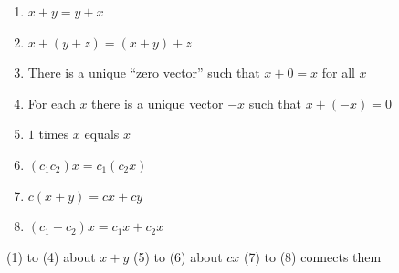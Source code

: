 \documentclass[14pt, a4paper]{article}
\begin{document}
\begin{enumerate}
    \item[(1)] $x + y = y + x$
    \item[(2)] $x + (y + z) = (x + y) + z$
    \item[(3)] There is a unique ``zero vector'' such that $x + 0 = x$ for all $x$
    \item[(4)] For each $x$ there is a unique vector $-x$ such that $x + (-x) = 0$
    \item[(5)] $1$ times $x$ equals $x$
    \item[(6)] $(c_1 c_2)x = c_1(c_2 x)$
    \item[(7)] $c(x + y) = cx + cy$
    \item[(8)] $(c_1 + c_2)x = c_1 x + c_2 x$
\end{enumerate}
\hspace*{2em}(1) to (4) about $x+y$ \qquad (5) to (6) about $cx$ \qquad (7) to (8) connects them
\end{document}
